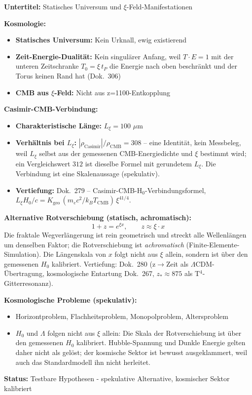 	\begin{documentbox}
		\textbf{Untertitel:} Statisches Universum und $\xi$-Feld-Manifestationen
		
		\textbf{Kosmologie:}
		\begin{itemize}
			\item \textbf{Statisches Universum:} Kein Urknall, ewig existierend
			\item \textbf{Zeit-Energie-Dualität:} Kein singulärer Anfang, weil $T\cdot E = 1$ mit der unteren Zeitschranke $T_0 = \xi\,t_P$ die Energie nach oben beschränkt und der Torus keinen Rand hat (Dok.~306)
			\item \textbf{CMB aus $\xi$-Feld:} Nicht aus z=1100-Entkopplung
		\end{itemize}
		
		\textbf{Casimir-CMB-Verbindung:}
		\begin{itemize}
			\item \textbf{Charakteristische Länge:} $L_\xi = 100$ $\mu$m
			\item \textbf{Verhältnis bei $L_\xi$:} $|\rho_{\text{Casimir}}|/\rho_{\text{CMB}} = 308$ -- eine Identität, kein Messbeleg, weil $L_\xi$ selbst aus der gemessenen CMB-Energiedichte und $\xi$ bestimmt wird; ein Vergleichswert $312$ ist dieselbe Formel mit gerundetem $L_\xi$. Die Verbindung ist eine Skalenaussage (spekulativ).
			\item \textbf{Vertiefung:} Dok.~279 -- Casimir-CMB-H$_0$-Verbindungsformel, $L_\xi H_0/c = K_{\text{geo}}\,(m_e c^2/k_B T_{\text{CMB}})\,\xi^{41/4}$.
		\end{itemize}
		
		\textbf{Alternative Rotverschiebung (statisch, achromatisch):}
		\begin{equation}
			1+z = e^{\xi x}, \qquad z \approx \xi \cdot x
		\end{equation}
		Die fraktale Wegverlängerung ist rein geometrisch und streckt alle
		Wellenlängen um denselben Faktor; die Rotverschiebung ist \emph{achromatisch}
		(Finite-Elemente-Simulation). Die Längenskala von $x$ folgt nicht aus $\xi$
		allein, sondern ist über den gemessenen $H_0$ kalibriert. Vertiefung: Dok.~280 (z$\to$Zeit als $\Lambda$CDM-Übertragung, kosmologische
		Entartung Dok.~267, $z_*\approx 875$ als T$^4$-Gitterresonanz).
		
		\textbf{Kosmologische Probleme (spekulativ):}
		\begin{itemize}
			\item Horizontproblem, Flachheitsproblem, Monopolproblem, Altersproblem
			\item $H_0$ und $\Lambda$ folgen nicht aus $\xi$ allein: Die Skala der Rotverschiebung ist über den gemessenen $H_0$ kalibriert. Hubble-Spannung und Dunkle Energie gelten daher nicht als gelöst; der kosmische Sektor ist bewusst ausgeklammert, weil auch das Standardmodell ihn nicht herleitet.
		\end{itemize}
		
		\textbf{Status:} Testbare Hypothesen - spekulative Alternative, kosmischer Sektor kalibriert
	\end{documentbox}
	
